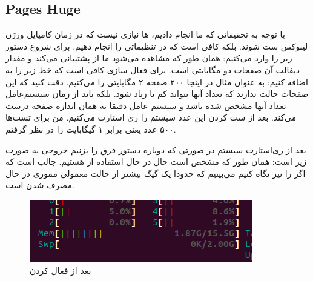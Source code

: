 \subsection{Pages Huge}
با توجه به تحقیقاتی که ما انجام دادیم،
ها
نیازی نیست که در زمان کامپایل ورژن لینوکس ست شوند. بلکه کافی است که در
تنظیماتی را انجام دهیم. برای شروع دستور زیر را وارد می‌کنیم:
همان طور که مشاهده می‌شود
ما از
پشتیبانی می‌کند و مقدار دیفالت آن صفحات دو مگابایتی است. برای فعال سازی
کافی است که خط زیر را به
اضافه کنیم:
به عنوان مثال در اینجا ۲۰۰ صفحه ۲ مگابایتی را
می‌کنیم. دقت کنید که این صفحات حالت 
ندارند که تعداد آنها بتواند کم یا زیاد شود. بلکه باید از زمان
سیستم‌عامل تعداد آنها مشخص شده باشد و سیستم عامل دقیقا به همان اندازه صفحه درست می‌کند.
بعد از ست کردن این عدد سیستم را ری استارت می‌کنیم. من برای تست‌ها ۵۰۰ عدد یعنی برابر ۱ گیگابایت
را در نظر گرفتم.

بعد از ری‌استارت سیستم در صورتی که دوباره دستور فرق را بزنیم خروجی به صورت زیر است:
همان طور که مشخص است حال در حال استفاده از
هستیم. جالب است که اگر
را نیز نگاه کنیم می‌بینیم که حدودا یک گیگ بیشتر از حالت معمولی مموری در حال مصرف شدن است.
\begin{figure}[H]
    \centering
    \includegraphics[scale=0.75]{pictures/intro/hugepages-htop.png}
    \caption{ بعد از فعال کردن }
    \label{fig:into:hugepages:htop}
\end{figure}